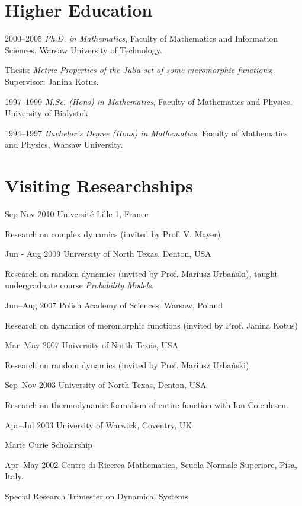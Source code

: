 \documentclass{article}
\begin{document}
\section{Higher Education}
\begin{CV}
\item[2000--2005] \emph{Ph.D. in Mathematics}, Faculty of Mathematics and
  Information Sciences, Warsaw University of Technology.

  Thesis: \emph{Metric Properties of the Julia set of some meromorphic
    functions}; Supervisor: Janina Kotus.

\item[1997--1999] \emph{M.Sc. (Hons) in Mathematics}, Faculty of Mathematics
  and Physics, University of Bialystok.

\item[1994--1997] {\em Bachelor's Degree (Hons) in Mathematics,} Faculty of
  Mathematics and Physics, Warsaw University.
  

\end{CV}

\section{Visiting Researchships}
\begin{CV}
  \item[Sep-Nov 2010] Universit{\'e} Lille 1, France

    Research on complex dynamics (invited by Prof. V. Mayer)

    
  \item[Jun - Aug 2009] University of North Texas, Denton, USA
  
    Research on random dynamics (invited by Prof. Mariusz
    Urba{\'n}ski), taught undergraduate course \emph{Probability Models}.
  \item[Jun--Aug 2007] Polish Academy of Sciences, Warsaw, Poland

    Research on dynamics of meromorphic functions (invited by
    Prof. Janina Kotus)
  \item[Mar--May 2007] University of North Texas, USA
  
    Research on random dynamics (invited by Prof. Mariusz
    Urba{\'n}ski).

  \item[Sep--Nov 2003] University of North Texas, Denton, USA

    Research on thermodynamic formalism of entire function with Ion
    Coiculescu.
  \item[Apr--Jul 2003] University of Warwick, Coventry, UK
    
    Marie Curie Scholarship
  \item[Apr--May 2002] Centro di Ricerca Mathematica, Scuola Normale
    Superiore, Pisa, Italy.

    Special Research Trimester on Dynamical Systems.
\end{CV}
\end{document}
